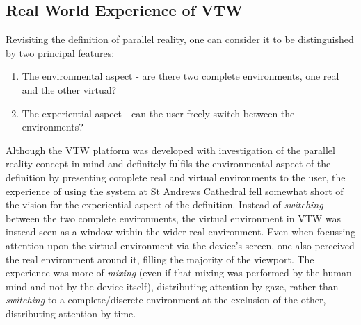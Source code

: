 

\subsection{Real World Experience of VTW}
\label{real-world-experience-of-vtw}


Revisiting the definition of parallel reality, one can consider it to be distinguished by two principal features:

\begin{enumerate}
	\item The environmental aspect - are there two complete environments, one real and the other virtual?
	\item The experiential aspect - can the user freely switch between the environments?
\end{enumerate}

Although the VTW platform was developed with investigation of the parallel reality concept in mind and definitely fulfils the environmental aspect of the definition by presenting complete real and virtual environments to the user, the experience of using the system at St Andrews Cathedral fell somewhat short of the vision for the experiential aspect of the definition. Instead of \textit{switching} between the two complete environments, the virtual environment in VTW was instead seen as a window within the wider real environment. Even when focussing attention upon the virtual environment via the device's screen, one also perceived the real environment around it, filling the majority of the viewport. The experience was more of \textit{mixing} (even if that mixing was performed by the human mind and not by the device itself), distributing attention by gaze, rather than \textit{switching} to a complete/discrete environment at the exclusion of the other, distributing attention by time.


